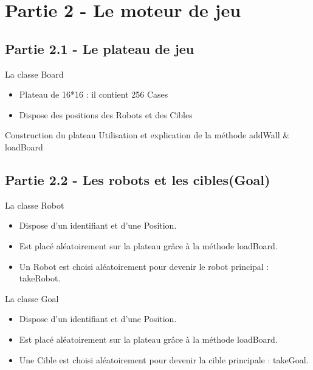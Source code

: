 \documentclass{beamer} %
\begin{document}
\section{Partie 2 - Le moteur de jeu}
	\subsection{Partie 2.1 - Le plateau de jeu}
\begin{frame}[plain]
\begin{alertblock}{La classe Board}
	\begin{itemize}
		\item Plateau de 16*16 : il contient 256 Cases
		\item Dispose des positions des Robots et des Cibles
	\end{itemize}
\end{alertblock}

\begin{exampleblock}{Construction du plateau}
Utilisation et explication de la méthode addWall \& loadBoard
\end{exampleblock}
\end{frame}


	\subsection{Partie 2.2 - Les robots et les cibles(Goal)}
\begin{frame}[plain]
\begin{exampleblock}{La classe Robot}
	\begin{itemize}
		\item Dispose d'un identifiant et d'une Position.
		\item Est placé aléatoirement sur la plateau grâce à la méthode loadBoard.
		\item Un Robot est choisi aléatoirement pour devenir le robot principal : takeRobot.
	\end{itemize}
\end{exampleblock}
\begin{exampleblock}{La classe Goal}
	\begin{itemize}
		\item Dispose d'un identifiant et d'une Position.
		\item Est placé aléatoirement sur la plateau grâce à la méthode loadBoard.
		\item Une Cible est choisi aléatoirement pour devenir la cible principale : takeGoal.
	\end{itemize}
\end{exampleblock}
\end{frame}
\end{document}
